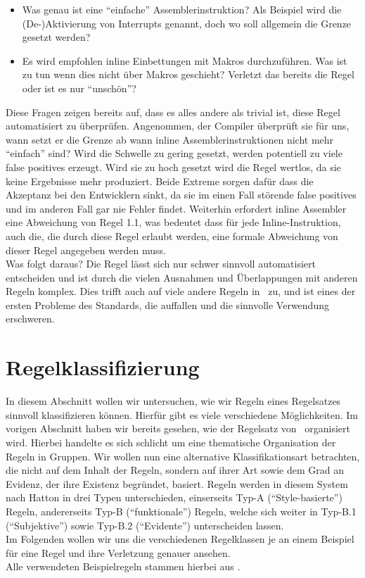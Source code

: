 \documentclass[a4paper,UKenglish,cleveref, autoref]{templates/lipics-v2019}
\begin{document}
    \begin{itemize}
        \item Was genau ist eine \enquote{einfache} Assemblerinstruktion?
            Als Beispiel wird die (De-)Aktivierung von Interrupts genannt, doch wo soll allgemein die Grenze gesetzt werden?
        \item Es wird empfohlen inline Einbettungen mit Makros durchzuführen.
            Was ist zu tun wenn dies nicht über Makros geschieht?
            Verletzt das bereits die Regel oder ist es nur \enquote{unschön}?
    \end{itemize}

    Diese Fragen zeigen bereits auf, dass es alles andere als trivial ist, diese Regel automatisiert zu überprüfen.
    Angenommen, der Compiler überprüft sie für uns, wann setzt er die Grenze ab wann inline Assemblerinstruktionen
    nicht mehr \enquote{einfach} sind?
    Wird die Schwelle zu gering gesetzt, werden potentiell zu viele false positives erzeugt.
    Wird sie zu hoch gesetzt wird die Regel wertlos, da sie keine Ergebnisse mehr produziert.
    Beide Extreme sorgen dafür dass die Akzeptanz bei den Entwicklern sinkt, da sie im einen Fall störende false positives
    und im anderen Fall gar nie Fehler findet.
    Weiterhin erfordert inline Assembler eine Abweichung von Regel 1.1, was bedeutet dass für jede Inline-Instruktion,
    auch die, die durch diese Regel erlaubt werden, eine formale Abweichung von dieser Regel angegeben werden muss.\\
    Was folgt daraus?
    Die Regel lässt sich nur schwer sinnvoll automatisiert entscheiden und ist durch die vielen Ausnahmen und Überlappungen
    mit anderen Regeln komplex.
    Dies trifft auch auf viele andere Regeln in \misra\ zu, und ist eines der ersten Probleme des Standards, die auffallen
    und die sinnvolle Verwendung erschweren.

    \section{Regelklassifizierung}
    \label{sec:regelklassifizierung}
    In diesem Abschnitt wollen wir untersuchen, wie wir Regeln eines Regelsatzes sinnvoll klassifizieren können.
    Hierfür gibt es viele verschiedene Möglichkeiten.
    Im vorigen Abschnitt haben wir bereits gesehen, wie der Regelsatz von \misra\ organisiert wird.
    Hierbei handelte es sich schlicht um eine thematische Organisation der Regeln in Gruppen.
    Wir wollen nun eine alternative Klassifikationsart betrachten, die nicht auf dem Inhalt der Regeln, sondern auf ihrer
    Art sowie dem Grad an Evidenz, der ihre Existenz begründet, basiert.
    Regeln werden in diesem System nach Hatton in drei Typen unterschieden, einserseits Typ-A (\enquote{Style-basierte}) Regeln,
    andererseits Typ-B (\enquote{funktionale}) Regeln, welche sich weiter in Typ-B.1 (\enquote{Subjektive}) sowie
    Typ-B.2 (\enquote{Evidente}) unterscheiden lassen.\cite{hatton2004safer}\\
    Im Folgenden wollen wir uns die verschiedenen Regelklassen je an einem Beispiel für eine Regel und ihre Verletzung
    genauer ansehen.\\
    Alle verwendeten Beispielregeln stammen hierbei aus \misra.
\end{document}
